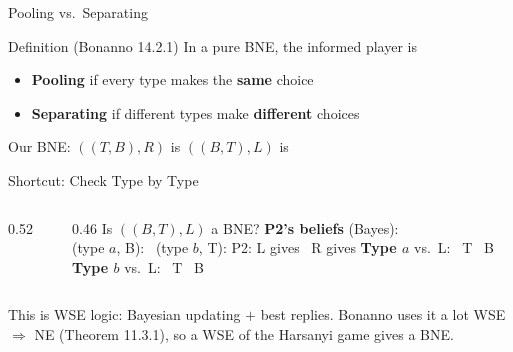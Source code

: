 \begin{frame}{Pooling vs.\ Separating}
\begin{block}{Definition (Bonanno 14.2.1)}
In a pure BNE, the informed player is
\begin{itemize}
    \item \textbf{Pooling} if every type makes the \textbf{same} choice
    \item \textbf{Separating} if different types make \textbf{different} choices
\end{itemize}
\end{block}
\bsk
Our BNE: $((T,B),R)$ is \underline{\hspace{1in}} \quad $((B,T),L)$ is \underline{\hspace{1in}}
\bsk
{}
\vspace{-0.3in}
\end{frame}

\begin{frame}{Shortcut: Check Type by Type}
\begin{columns}[c]
\begin{column}{0.52\textwidth}
\centering
\harsanyitree[0.72]
\end{column}
\begin{column}{0.46\textwidth}
Is $((B,T),L)$ a BNE?
\bsk
\textbf{P2's beliefs} (Bayes):\\
(type $a$, B): \underline{\hspace{0.4in}} \ (type $b$, T): \underline{\hspace{0.4in}}
\bsk
P2: L gives \underline{\hspace{0.3in}} \ R gives \underline{\hspace{0.3in}}
\bsk
\textbf{Type $a$} vs.\ L: \ T \underline{\hspace{0.25in}} \ B \underline{\hspace{0.25in}}\\[4pt]
\textbf{Type $b$} vs.\ L: \ T \underline{\hspace{0.25in}} \ B \underline{\hspace{0.25in}}
\end{column}
\end{columns}
\bsk
This is WSE logic: Bayesian updating $+$ best replies. Bonanno uses it a lot
\vfill
{\footnotesize WSE $\Rightarrow$ NE (Theorem 11.3.1), so a WSE of the Harsanyi game gives a BNE.}
\vspace{-0.2in}
\end{frame}

